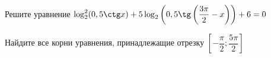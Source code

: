 \begin{ex}
	\begin{condition}
		\begin{enumcols}[label=\asbuk*)]
			\item Решите уравнение \( \log_2^2 (0,5\ctg x )+5\log_2 \left(0,5\tg \left(\dfrac{3\pi}{2} - x\right)\right) + 6 = 0 \)
			\item Найдите все корни уравнения, принадлежащие отрезку \( \left[-\dfrac{\pi}{2};\dfrac{5\pi}{2}\right] \)
		\end{enumcols}
	\end{condition}
\end{ex}